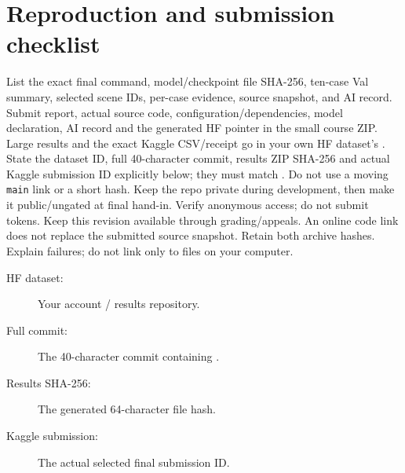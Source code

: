 \documentclass[11pt]{article}
\begin{document}
\section{Reproduction and submission checklist}
List the exact final command, model/checkpoint file SHA-256, ten-case Val
summary, selected scene IDs, per-case evidence, source snapshot, and AI record.
Submit report, actual source code, configuration/dependencies, model declaration,
AI record and the generated HF pointer in the small course ZIP. Large results
and the exact Kaggle CSV/receipt go in your own HF dataset's .
State the dataset ID, full 40-character commit, results ZIP SHA-256 and actual
Kaggle submission ID explicitly below; they must match .
Do not use a moving \texttt{main} link or a short hash. Keep the repo private during
development, then make it public/ungated at final hand-in. Verify anonymous access;
do not submit tokens. Keep this revision available through grading/appeals.
An online code link does not replace the submitted source snapshot. Retain both
archive hashes. Explain failures; do not link only to files on your computer.
\begin{description}
\item[HF dataset:] Your account / results repository.
\item[Full commit:] The 40-character commit containing .
\item[Results SHA-256:] The generated 64-character file hash.
\item[Kaggle submission:] The actual selected final submission ID.
\end{description}
% 
% 
\end{document}
